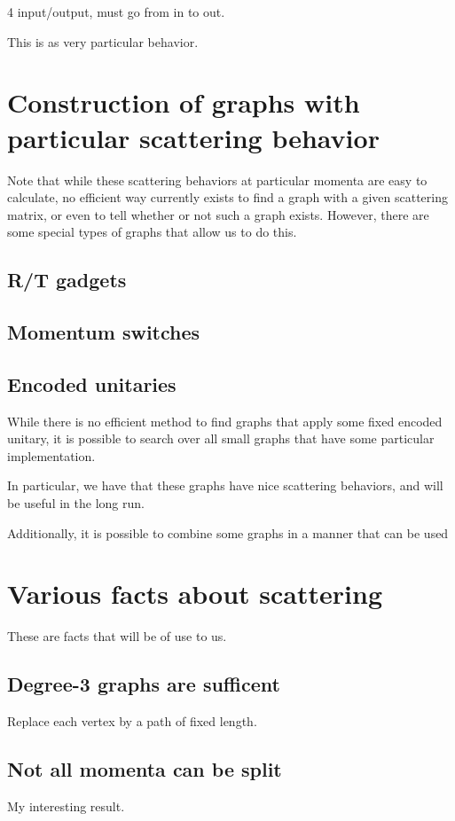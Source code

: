 \documentclass[../thesis-main/thesis-main]{subfiles}
\begin{document}
4 input/output, must go from in to out.

This is as very particular behavior.


\section{Construction of graphs with particular scattering behavior}

Note that while these scattering behaviors at particular momenta are easy to calculate, no efficient way currently exists to find a graph with a given scattering matrix, or even to tell whether or not such a graph exists.  However, there are some special types of graphs that allow us to do this.

\subsection{R/T gadgets}

\subsection{Momentum switches}

\subsection{Encoded unitaries}

While there is no efficient method to find graphs that apply some fixed encoded unitary, it is possible to search over all small graphs that have some particular implementation.


In particular, we have that these graphs have nice scattering behaviors, and will be useful in the long run.

Additionally, it is possible to combine some graphs in a manner that can be used 


\section{Various facts about scattering}

These are facts that will be of use to us.

\subsection{Degree-3 graphs are sufficent}

Replace each vertex by a path of fixed length.

\subsection{Not all momenta can be split}

My interesting result.
\end{document}
